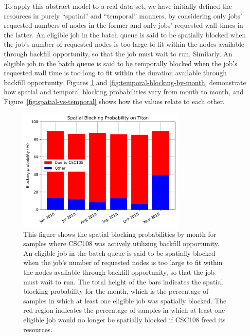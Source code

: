 To apply this abstract model to a real data set, we have initially defined the
resources in purely ``spatial'' and ``temporal'' manners, by considering only
jobs' requested numbers of nodes in the former and only jobs' requested wall
times in the latter. An eligible job in the batch queue is said to be spatially
blocked when the job’s number of requested nodes is too large to fit within the
nodes available through backfill opportunity, so that the job must wait to run.
Similarly, An eligible job in the batch queue is said to be temporally blocked
when the job’s requested wall time is too long to fit within the duration
available through backfill opportunity. Figures
\ref{fig:spatial-blocking-by-month} and \ref{fig:temporal-blocking-by-month}
demonstrate how spatial and temporal blocking probabilities vary from month to
month, and Figure~\ref{fig:spatial-vs-temporal} shows how the values relate to
each other.

\begin{figure}
  \includegraphics[width=0.75\textwidth]{images/barplot-spatial-blocking-by-month.png}
\caption{This figure shows the spatial blocking probabilities by month for
samples where CSC108 was actively utilizing backfill opportunity. An eligible
job in the batch queue is said to be spatially blocked when the job's number of
requested nodes is too large to fit within the nodes available through backfill
opportunity, so that the job must wait to run. The total height of the bars
indicates the spatial blocking probability for the month, which is the
percentage of samples in which at least one eligible job was spatially blocked.
The red region indicates the percentage of samples in which at least one
eligible job would no longer be spatially blocked if CSC108 freed its
resources.}
\label{fig:spatial-blocking-by-month}
\end{figure}

